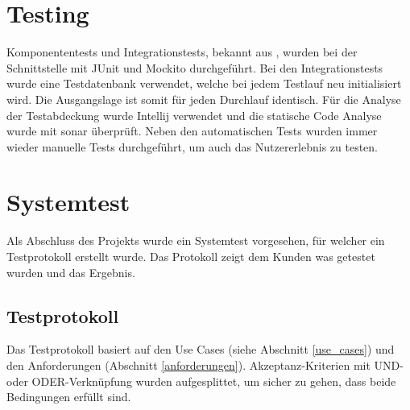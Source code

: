 \section{Testing}
Komponententests und Integrationstests, bekannt aus \cite{test_soft_book}, wurden bei der Schnittstelle mit JUnit und Mockito durchgeführt. Bei den Integrationstests wurde eine 
Testdatenbank verwendet, welche bei jedem Testlauf neu initialisiert wird. Die Ausgangslage ist somit für jeden Durchlauf identisch. Für die Analyse der Testabdeckung wurde Intellij 
verwendet und die statische Code Analyse wurde mit \gls{sonar} überprüft. Neben den automatischen Tests wurden immer wieder manuelle Tests durchgeführt, um auch das Nutzererlebnis 
zu testen.

\section{Systemtest}
Als Abschluss des Projekts wurde ein Systemtest vorgesehen, für welcher ein Testprotokoll erstellt wurde. Das Protokoll zeigt dem Kunden was getestet wurden und das Ergebnis.

\subsection{Testprotokoll}
Das Testprotokoll basiert auf den Use Cases (siehe Abschnitt \ref{use_cases}) und den Anforderungen (Abschnitt \ref{anforderungen}). Akzeptanz-Kriterien mit UND- oder ODER-Verknüpfung 
wurden aufgesplittet, um sicher zu gehen, dass beide Bedingungen erfüllt sind.

